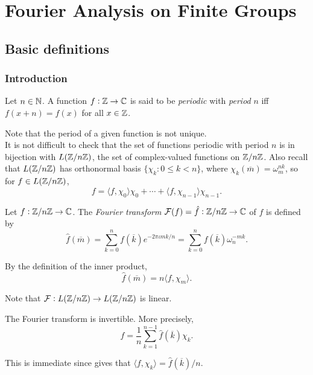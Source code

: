 \section{Fourier Analysis on Finite Groups}

	\subsection{Basic definitions}

		\subsubsection{Introduction}

			\begin{definition}
				Let $n \in \mathbb{N}$. A function $f : \mathbb{Z} \to \mathbb{C}$ is said to be \emph{periodic} with \emph{period} $n$ iff $f(x+n) = f(x)$ for all $x \in \mathbb{Z}$.
			\end{definition}

			Note that the period of a given function is not unique.\\
			It is not difficult to check that the set of functions periodic with period $n$ is in bijection with $L(\mathbb{Z}/n\mathbb{Z})$, the set of complex-valued functions on $\mathbb{Z}/n\mathbb{Z}$. Also recall that $L(\mathbb{Z}/n\mathbb{Z})$ has orthonormal basis $\{\chi_k : 0 \le k < n\}$, where $\chi_k(\overline{m}) = \omega_m^{nk}$, so for $f \in L(\mathbb{Z}/n\mathbb{Z})$,
			\[ f = \langle f,\chi_0\rangle \chi_0 + \cdots + \langle f,\chi_{n-1}\rangle \chi_{n-1}. \]

			\begin{fdef}
				Let $f : \mathbb{Z}/n\mathbb{Z} \to \mathbb{C}$. The \emph{Fourier transform} $\mathcal{F}(f) = \hat{f} : \mathbb{Z}/n\mathbb{Z} \to \mathbb{C}$ of $f$ is defined by
				\[ \hat{f}(\overline{m}) = \sum_{k=0}^n f(\overline{k}) e^{-2\pi\iota mk/n} = \sum_{k=0}^n f(\overline{k}) \omega_n^{-mk}. \]
			\end{fdef}

			By the definition of the inner product,
			\begin{equation}
				\label{eqn: fourier character innprod relation}
				\hat{f}(\overline{m}) = n \langle f,\chi_m\rangle.
			\end{equation}

			Note that $\mathcal{F} : L(\mathbb{Z}/n\mathbb{Z}) \to L(\mathbb{Z}/n\mathbb{Z})$ is linear.

			\begin{fprop}
				The Fourier transform is invertible. More precisely,
				\[ f = \frac{1}{n} \sum_{k=1}^{n-1} \hat{f}(\overline{k}) \chi_k. \]
			\end{fprop}
			This is immediate since  gives that $\langle f,\chi_k\rangle = \hat{f}(\overline{k})/n$.

